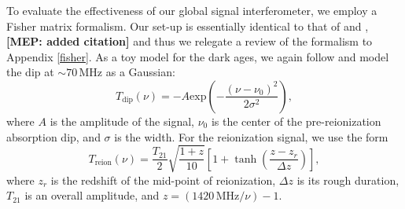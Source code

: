 \documentclass[twocolumn,apj,numberedappendix]{emulateapj}
\newcommand{\mep}[1]{{\color{applegreen} \textbf{[MEP:  #1]}}}
\begin{document}
To evaluate the effectiveness of our global signal interferometer, we employ a Fisher matrix formalism. Our set-up is essentially identical to that of \citet{Pritchard+Loeb2010} and \citet{BernardiLEDA}, \mep{added citation} and thus we relegate a review of the formalism to Appendix \ref{fisher}. As a toy model for the dark ages, we again follow \citet{BernardiLEDA} and model the dip at $\sim 70\,\textrm{MHz}$ as a Gaussian:
\begin{equation}
\label{eq:Dip}
T_\textrm{dip}(\nu) = -A \textrm{exp}\left ( -\frac{(\nu - \nu_0)^2}{2\sigma^2} \right ),
\end{equation}
where $A$ is the amplitude of the signal, $\nu_0$ is the center of the pre-reionization absorption dip, and $\sigma$ is the width. For the reionization signal, we use the form
\begin{equation}
\label{eq:Step}
T_\textrm{reion}(\nu) = \frac{T_{21}}{2} \sqrt{\frac{1+z}{10}}\left[ 1 +  \tanh \left( \frac{z-z_r}{\Delta z} \right)\right],
\end{equation}
where $z_r$ is the redshift of the mid-point of reionization, $\Delta z$ is its rough duration, $T_{21}$ is an overall amplitude, and $z = (1420 \,\textrm{MHz} / \nu) - 1$.
\end{document}
